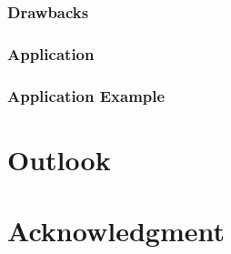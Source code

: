 \documentclass[conference]{IEEEtran}
\begin{document}
\subsubsection{Drawbacks}

\subsubsection{Application}

\subsubsection{Application Example}

\section {Outlook}

\section*{Acknowledgment}



\end{document}
